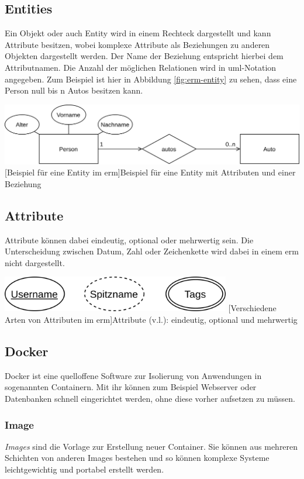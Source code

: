\documentclass[12pt,twoside,a4paper]{article}
\begin{document}
\begin{sloppypar}
\subsection*{Entities}
Ein Objekt oder auch Entity wird in einem Rechteck dargestellt und kann Attribute besitzen, wobei komplexe Attribute als Beziehungen zu anderen Objekten dargestellt werden. Der Name der Beziehung entspricht hierbei dem Attributnamen. Die Anzahl der möglichen Relationen wird in \acrshort{uml}-Notation angegeben. Zum Beispiel ist hier in Abbildung \ref{fig:erm-entity} zu sehen, dass eine Person null bis n Autos besitzen kann.
\begin{center}
	\captionsetup{type=figure}
	\includegraphics[width=\textwidth]{images/ERM-Entity}
	[Beispiel für eine Entity im \acrshort{erm}]{Beispiel für eine Entity mit Attributen und einer Beziehung}
	\label{fig:erm-entity}
\end{center}
\subsection*{Attribute}
Attribute können dabei eindeutig, optional oder mehrwertig sein. Die Unterscheidung zwischen Datum, Zahl oder Zeichenkette wird dabei in einem \acrlong{erm} nicht dargestellt.
\begin{center}
	\captionsetup{type=figure}
	\includegraphics[width=10cm]{images/ERM-Attributes}
	[Verschiedene Arten von Attributen im \acrshort{erm}]{Attribute (v.l.): eindeutig, optional und mehrwertig}
	\label{fig:erm-attributes}
\end{center}
\subsection{Docker}
Docker ist eine quelloffene Software zur Isolierung von Anwendungen in sogenannten Containern. Mit ihr können zum Beispiel Webserver oder Datenbanken schnell eingerichtet werden, ohne diese vorher aufsetzen zu müssen.
\subsubsection{Image}
\textit{Images} sind die Vorlage zur Erstellung neuer Container. Sie können aus mehreren Schichten von anderen Images bestehen und so können komplexe Systeme leichtgewichtig und portabel erstellt werden.

\end{sloppypar}
\end{document}
